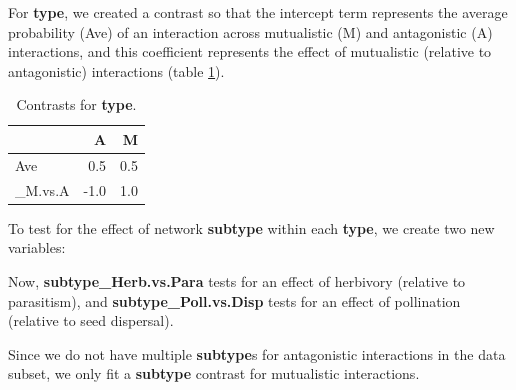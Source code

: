 \documentclass[11pt,]{article}
\newenvironment{Shaded}{}{}
\newcommand{\KeywordTok}[1]{\textcolor[rgb]{0.00,0.00,1.00}{#1}}
\newcommand{\DataTypeTok}[1]{#1}
\newcommand{\DecValTok}[1]{#1}
\newcommand{\StringTok}[1]{\textcolor[rgb]{0.00,0.50,0.50}{#1}}
\newcommand{\OperatorTok}[1]{#1}
\newcommand{\NormalTok}[1]{#1}
\begin{document}
For \textbf{type}, we created a contrast so that the intercept term
represents the average probability (Ave) of an interaction across
mutualistic (M) and antagonistic (A) interactions, and this coefficient
represents the effect of mutualistic (relative to antagonistic)
interactions (table \ref{tab:type-contrasts}).

\begin{table}[!h]

\caption{\label{tab:type-contrasts}Contrasts for \textbf{type}.}
\centering
\begin{tabular}{lrr}
\toprule
  & A & M\\
\midrule
Ave & 0.5 & 0.5\\
\_M.vs.A & -1.0 & 1.0\\
\bottomrule
\end{tabular}
\end{table}

To test for the effect of network \textbf{subtype} within each
\textbf{type}, we create two new variables:

\begin{Shaded}
\end{Shaded}

Now, \textbf{subtype\_Herb.vs.Para} tests for an effect of herbivory
(relative to parasitism), and \textbf{subtype\_Poll.vs.Disp} tests for
an effect of pollination (relative to seed dispersal).

Since we do not have multiple \textbf{subtype}s for antagonistic
interactions in the data subset, we only fit a \textbf{subtype} contrast
for mutualistic interactions.
\end{document}

